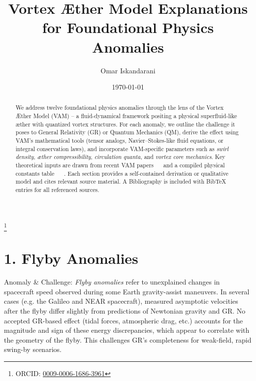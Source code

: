 \documentclass[a4paper, aps,preprint,superscriptaddress, 12pt]{revtex4}
\begin{document}
    \author{Omar Iskandarani}
    \title{Vortex Æther Model Explanations for Foundational Physics Anomalies}
    \date{\today}
    \thanks{ORCID: \href{https://orcid.org/0009-0006-1686-3961}{0009-0006-1686-3961}}


    \begin{abstract}
        We address twelve foundational physics anomalies through the lens of the Vortex Æther Model (VAM) – a fluid-dynamical framework positing a physical superfluid-like æther with quantized vortex structures. For each anomaly, we outline the challenge it poses to General Relativity (GR) or Quantum Mechanics (QM), derive the effect using VAM’s mathematical tools (tensor analogs, Navier–Stokes-like fluid equations, or integral conservation laws), and incorporate VAM-specific parameters such as \textit{swirl density}, \textit{æther compressibility}, \textit{circulation quanta}, and \textit{vortex core mechanics}. Key theoretical inputs are drawn from recent VAM papers~\cite{Iskandarani2025a} ~\cite{Iskandarani2025c}  and a compiled physical constants table~\cite{VAM_constants} ~\cite{Iskandarani2025b} . Each section provides a self-contained derivation or qualitative model and cites relevant source material. A Bibliography is included with BibTeX entries for all referenced sources.
    \end{abstract}

  \maketitle


\section*{1. Flyby Anomalies}

Anomaly \& Challenge: \textit{Flyby anomalies} refer to unexplained changes in spacecraft speed observed during some Earth gravity-assist maneuvers. In several cases (e.g. the Galileo and NEAR spacecraft), measured asymptotic velocities after the flyby differ slightly from predictions of Newtonian gravity and GR. No accepted GR-based effect (tidal forces, atmospheric drag, etc.) accounts for the magnitude and sign of these energy discrepancies, which appear to correlate with the geometry of the flyby. This challenges GR’s completeness for weak-field, rapid swing-by scenarios.
\end{document}
